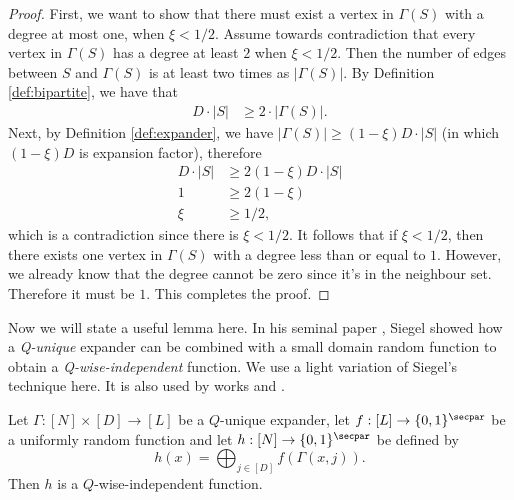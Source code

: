 \begin{proof}
    First, we want to show that there must exist a vertex in $\Gamma(S)$ with a degree at most one, when $\xi < 1/2$. Assume towards contradiction that every vertex in $\Gamma(S)$ has a degree at least $2$ when $\xi < 1/2$. Then the number of edges between $S$ and $\Gamma(S)$ is at least two times as $|\Gamma(S)|$. By Definition \ref{def:bipartite}, we have that
	\begin{align*}
        D\cdot |S|   &\geq 2 \cdot |\Gamma(S)|.
	\end{align*}
Next, by Definition \ref{def:expander}, we have $|\Gamma(S)| \geq (1 - \xi)D\cdot |S|$ (in which $(1-\xi)D$ is expansion factor), therefore
	\begin{align*}
        D\cdot |S|   &\geq 2(1-\xi)D\cdot |S|\\
		1	 		 &\geq 2(1-\xi)\\
		\xi	         &\geq 1/2,
	\end{align*} which is a contradiction since there is $\xi < 1/2$. It follows that if $\xi < 1/2$, then there exists one vertex in $\Gamma(S)$ with a degree less than or equal to $1$. However, we already know that the degree cannot be zero since it's in the neighbour set. Therefore it must be $1$. This completes the proof.
\end{proof}

Now we will state a useful lemma here. In his seminal paper \cite{Siegel04}, Siegel showed how a \textit{Q-unique} expander can be combined with a small domain random function to obtain a \textit{Q-wise-independent} function. We use a light variation of Siegel's technique here. It is also used by works \cite{FOCS:Thorup13} and \cite{STOC:ChrPagTho15}.
\begin{lemma}\label{lem:unique-to-independence}
	Let $\Gamma: [N] \times [D] \to [L]$ be a $Q$-unique expander, let $f: [L] \to \{0,1\}^\secpar$ be a uniformly random function and let $h: [N] \rightarrow \{0,1\}^\secpar$ be defined by
	\[
	h(x) = \bigoplus_{j \in [D]} f(\Gamma(x,j)).
	\]
	Then $h$ is a $Q$-wise-independent function.
\end{lemma}

